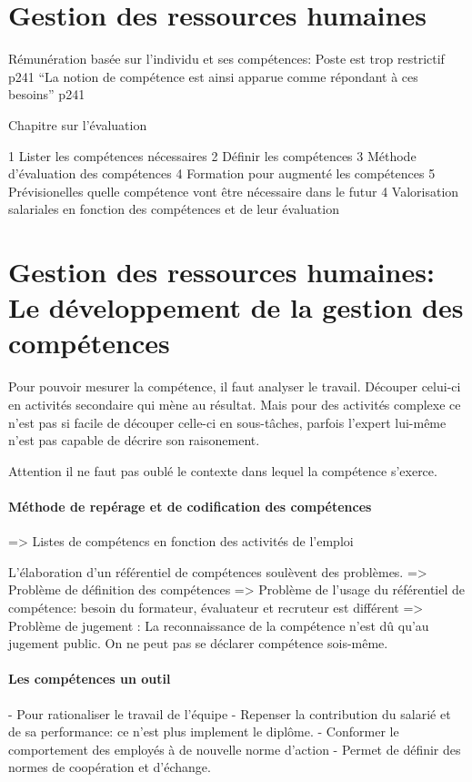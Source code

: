 \section{Gestion des ressources humaines} \cite{gestionressourceshumaine2007}


Rémunération basée sur l'individu et ses compétences: Poste est trop restrictif p241
``La notion de compétence est ainsi apparue comme répondant à ces besoins'' p241




Chapitre sur l'évaluation



1 Lister les compétences nécessaires
2 Définir les compétences 
3 Méthode d'évaluation des compétences
4 Formation pour augmenté les compétences
5 Prévisionelles quelle compétence vont être nécessaire dans le futur
4 Valorisation salariales en fonction des compétences et de leur évaluation

\section{Gestion des ressources humaines: Le développement de la gestion des compétences}


Pour pouvoir mesurer la compétence, il faut analyser le travail. Découper celui-ci en activités secondaire qui mène au résultat.
Mais pour des activités complexe ce n'est pas si facile de découper celle-ci en sous-tâches, parfois l'expert lui-même n'est pas capable de décrire son raisonement.

Attention il ne faut pas oublé le contexte dans lequel la compétence s'exerce. 

\paragraph{Méthode de repérage et de codification des compétences}



=> Listes de compétencs en fonction des activités de l'emploi

L'élaboration d'un référentiel de compétences soulèvent des problèmes. 
=> Problème de définition des compétences 
=> Problème de l'usage du référentiel de compétence: besoin du formateur, évaluateur et recruteur est différent
=> Problème de jugement : La reconnaissance de la compétence n'est dû qu'au jugement public. On ne peut pas se déclarer compétence sois-même. 



\paragraph{Les compétences un outil}
- Pour rationaliser le travail de l'équipe
- Repenser la contribution du salarié et de sa performance: ce n'est plus implement le diplôme. 
- Conformer le comportement des employés à de nouvelle norme d'action 
- Permet de définir des normes de coopération et d'échange. 

